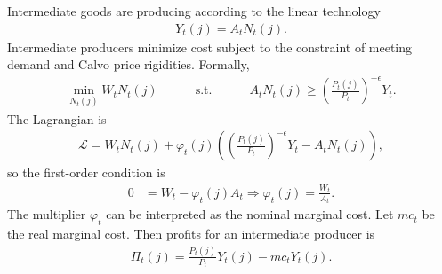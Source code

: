 \documentclass[12 pt, oneside]{article}
\theoremstyle{definition}
\theoremstyle{definition}
\theoremstyle{definition}
\newcommand{\calL}{\mathcal{L}}
\newcommand{\RA}{\Rightarrow}
\begin{document}
Intermediate goods are producing according to the linear technology
\begin{align*}
  Y_t(j) = A_t N_t(j).
\end{align*}
Intermediate producers minimize cost subject to the constraint of meeting demand and Calvo price rigidities. Formally,
\begin{align*}
  \min_{N_t(j)} W_t N_t(j)\quad\quad\quad\text{s.t.}\quad\quad\quad A_t N_t(j) \geq \left(\frac{P_t(j)}{P_t}\right)^{-\epsilon}Y_t.
\end{align*}
The Lagrangian is
\begin{align*}
  \calL = W_tN_t(j) + \varphi_t(j)\left(\left(\frac{P_t(j)}{P_t}\right)^{-\epsilon}Y_t - A_t N_t(j)\right),
\end{align*}
so the first-order condition is
\begin{align*}
  0 & = W_t - \varphi_t(j) A_t \RA \varphi_t(j) = \frac{W_t}{A_t}.
\end{align*}
The multiplier $\varphi_t$ can be interpreted as the nominal marginal cost. Let $mc_t$ be the real marginal cost. Then profits for
an intermediate producer is
\begin{align*}
  \Pi_t(j) = \frac{P_t(j)}{P_t}Y_t(j) - mc_t Y_t(j).
\end{align*}
\end{document}
